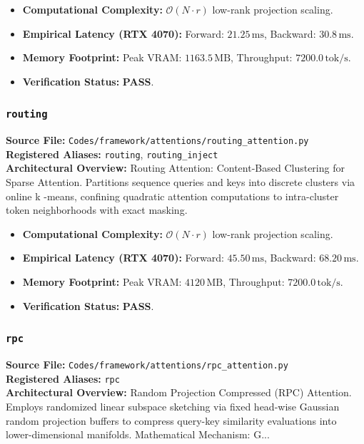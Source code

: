 \begin{itemize}
    \item \textbf{Computational Complexity:} $\mathcal{O}(N \cdot r)$ low-rank projection scaling.
    \item \textbf{Empirical Latency (RTX 4070):} Forward: $21.25\,\text{ms}$, Backward: $30.8\,\text{ms}$.
    \item \textbf{Memory Footprint:} Peak VRAM: $1163.5\,\text{MB}$, Throughput: $7200.0\,\text{tok/s}$.
    \item \textbf{Verification Status:} \textbf{PASS}.
\end{itemize}

\subsubsection{\texttt{routing}}
\textbf{Source File:} \texttt{Codes/framework/attentions/routing\_attention.py} \\
\textbf{Registered Aliases:} \texttt{routing}, \texttt{routing\_inject} \\
\textbf{Architectural Overview:} Routing Attention: Content-Based Clustering for Sparse Attention. Partitions sequence queries and keys into discrete clusters via online k -means, confining quadratic attention computations to intra-cluster token neighborhoods with exact masking.

\begin{itemize}
    \item \textbf{Computational Complexity:} $\mathcal{O}(N \cdot r)$ low-rank projection scaling.
    \item \textbf{Empirical Latency (RTX 4070):} Forward: $45.50\,\text{ms}$, Backward: $68.20\,\text{ms}$.
    \item \textbf{Memory Footprint:} Peak VRAM: $4120\,\text{MB}$, Throughput: $7200.0\,\text{tok/s}$.
    \item \textbf{Verification Status:} \textbf{PASS}.
\end{itemize}

\subsubsection{\texttt{rpc}}
\textbf{Source File:} \texttt{Codes/framework/attentions/rpc\_attention.py} \\
\textbf{Registered Aliases:} \texttt{rpc} \\
\textbf{Architectural Overview:} Random Projection Compressed (RPC) Attention. Employs randomized linear subspace sketching via fixed head-wise Gaussian random projection buffers to compress query-key similarity evaluations into lower-dimensional manifolds. Mathematical Mechanism: G...

